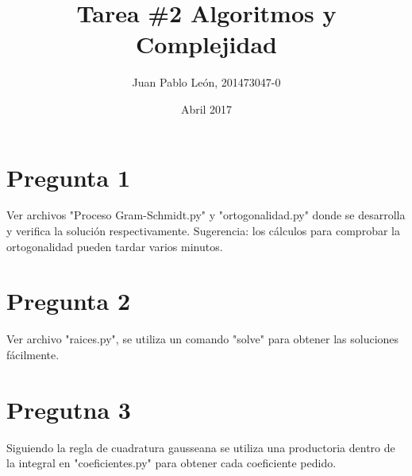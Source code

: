 \documentclass{article}
\title{Tarea \#2 Algoritmos y Complejidad}
\author{Juan Pablo León, 201473047-0 }
\date{Abril 2017}
\begin{document}
\maketitle

\section*{Pregunta 1}
Ver archivos "Proceso Gram-Schmidt.py" y "ortogonalidad.py" donde se desarrolla y verifica la solución respectivamente. Sugerencia: los cálculos para comprobar la ortogonalidad pueden tardar varios minutos.

\section*{Pregunta 2}
Ver archivo "raices.py", se utiliza un comando "solve" para obtener las soluciones fácilmente.

\section*{Pregutna 3}
Siguiendo la regla de cuadratura gausseana se utiliza una productoria
dentro de la integral en "coeficientes.py" para obtener cada
coeficiente pedido.
\end{document}

